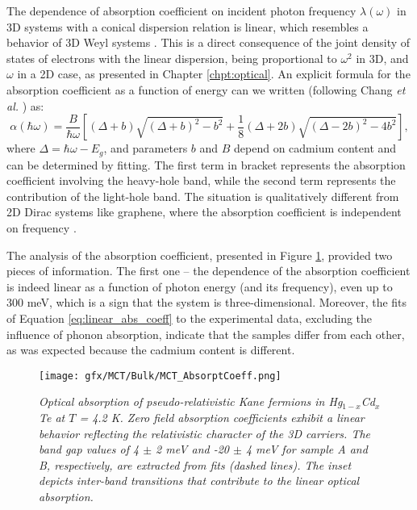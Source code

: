 \documentclass[titlepage,a4paper]{book}
\begin{document}
The dependence of absorption coefficient on incident photon frequency $\lambda (\omega)$ in 3D systems with a conical dispersion relation is linear, which resembles a behavior of 3D Weyl systems \cite{Malcolm_MCT}. This is a direct consequence of the joint density of states of electrons with the linear dispersion, being proportional to $\omega^2$ in 3D, and $\omega$ in a 2D case, as presented in Chapter \ref{chpt:optical}. An explicit formula for the absorption coefficient as a function of energy can we written (following Chang \textit{et al.} \cite{Chang_MCT_bulk}) as:
\begin{equation}
\label{eq:linear_abs_coeff}
\alpha (\hbar\omega) = \frac{B}{\hbar\omega} \left[ (\Delta + b)\sqrt{(\Delta+b)^2-b^2} + \frac{1}{8}(\Delta+2b)\sqrt{(\Delta-2b)^2-4b^2}\right],
\end{equation}
where $\Delta = \hbar\omega - E_g$, and parameters $b$ and $B$ depend on cadmium content and can be determined by fitting. The first term in bracket represents the absorption coefficient involving the heavy-hole band, while the second term represents the contribution of the light-hole band. The situation is qualitatively different from 2D Dirac systems like graphene, where the absorption coefficient is independent on frequency \cite{Kuzmenko_MCTBulk}.

The analysis of the absorption coefficient, presented in Figure \ref{fig:Samples_MCT_AbsorptCoeff}, provided two pieces of information. The first one -- the dependence of the absorption coefficient is indeed linear as a function of photon energy (and its frequency), even up to 300 meV, which is a sign that the system is three-dimensional. Moreover, the fits of Equation \ref{eq:linear_abs_coeff} to the experimental data, excluding the influence of phonon absorption, indicate that the samples differ from each other, as was expected because the cadmium content is different.

\begin{figure}[H]
	\centering
	\texttt{[image: gfx/MCT/Bulk/MCT\_AbsorptCoeff.png]}
	\vspace{-10pt}
	\caption{\textit{Optical absorption of pseudo-relativistic Kane fermions in Hg$_{1-x}$Cd$_x$Te at $T$ = 4.2 K. Zero field absorption coefficients exhibit a linear behavior reflecting the relativistic character of the 3D carriers. The band gap values of 4 $\pm$ 2 meV and -20 $\pm$ 4 meV for sample A and B, respectively, are extracted from fits (dashed lines). The inset depicts inter-band transitions that contribute to the linear optical absorption.}}	
\label{fig:Samples_MCT_AbsorptCoeff}
\end{figure} 
\end{document}

